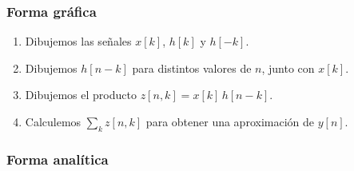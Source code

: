 \subsubsection{Forma gráfica}

\begin{enumerate}
	\item Dibujemos las señales $x[k]$, $h[k]$ y $h[-k]$.
	\item Dibujemos $h[n-k]$ para distintos valores de $n$, junto con $x[k]$.
	\item Dibujemos el producto $z[n,k] = x[k] \, h[n-k]$.
	\item Calculemos $\sum_{k} z[n,k]$ para obtener una aproximación de $y[n]$.
\end{enumerate}

\subsubsection{Forma analítica}


